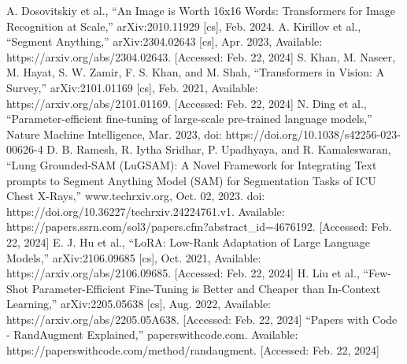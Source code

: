 \documentclass[conference]{IEEEtran}
\begin{document}
\begin{thebibliography}{00}
 A. Dosovitskiy et al., “An Image is Worth 16x16 Words: Transformers for Image Recognition at Scale,” arXiv:2010.11929 [cs], Feb. 2024.
 A. Kirillov et al., “Segment Anything,” arXiv:2304.02643 [cs], Apr. 2023, Available: https://arxiv.org/abs/2304.02643. [Accessed: Feb. 22, 2024]
 S. Khan, M. Naseer, M. Hayat, S. W. Zamir, F. S. Khan, and M. Shah, “Transformers in Vision: A Survey,” arXiv:2101.01169 [cs], Feb. 2021, Available: https://arxiv.org/abs/2101.01169. [Accessed: Feb. 22, 2024]
 N. Ding et al., “Parameter-efficient fine-tuning of large-scale pre-trained language models,” Nature Machine Intelligence, Mar. 2023, doi: https://doi.org/10.1038/s42256-023-00626-4
 D. B. Ramesh, R. Iytha Sridhar, P. Upadhyaya, and R. Kamaleswaran, “Lung Grounded-SAM (LuGSAM): A Novel Framework for Integrating Text prompts to Segment Anything Model (SAM) for Segmentation Tasks of ICU Chest X-Rays,” www.techrxiv.org, Oct. 02, 2023. doi: https://doi.org/10.36227/techrxiv.24224761.v1. Available: https://papers.ssrn.com/sol3/papers.cfm?abstract\_id=4676192. [Accessed: Feb. 22, 2024]
 E. J. Hu et al., “LoRA: Low-Rank Adaptation of Large Language Models,” arXiv:2106.09685 [cs], Oct. 2021, Available: https://arxiv.org/abs/2106.09685. [Accessed: Feb. 22, 2024]
 H. Liu et al., “Few-Shot Parameter-Efficient Fine-Tuning is Better and Cheaper than In-Context Learning,” arXiv:2205.05638 [cs], Aug. 2022, Available: https://arxiv.org/abs/2205.05A638. [Accessed: Feb. 22, 2024]
 “Papers with Code - RandAugment Explained,” paperswithcode.com. Available: https://paperswithcode.com/method/randaugment. [Accessed: Feb. 22, 2024]

\end{thebibliography}
\end{document}
